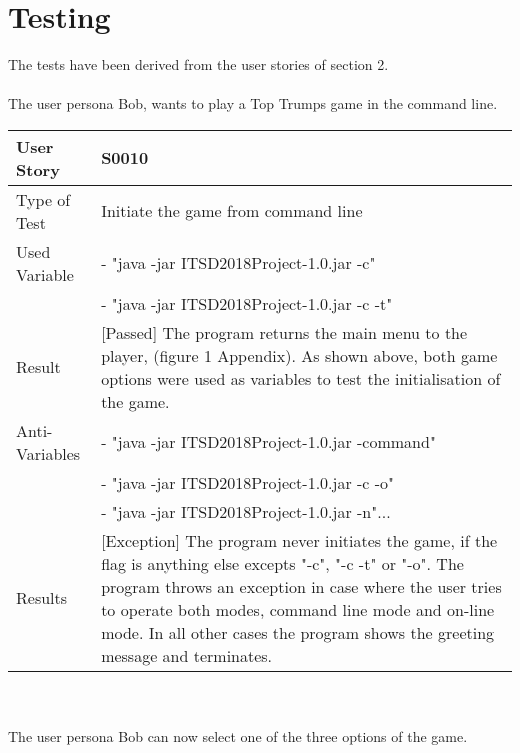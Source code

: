 
\newpage

\section{Testing}

The tests have been derived from the user stories of section 2.\\
\vspace{0.1cm}\\
The user persona Bob, wants to play a Top Trumps game in the command line.    
\vspace{0.4cm}\\
\begin{tabular}{l | p{10cm}}
User Story & \textbf{S0010} \\
\hline
Type of Test & Initiate the game from command line\\
\hline
Used Variable & 
 - "java -jar ITSD2018Project-1.0.jar -c" \\
 & 
 - "java -jar ITSD2018Project-1.0.jar -c -t"
\\
\hline
Result & [Passed] The program returns the main menu to the player, (figure 1 Appendix). As shown above, both game options were used as variables to test the initialisation of the game.\\ 
\hline
Anti-Variables & - "java -jar ITSD2018Project-1.0.jar -command"\\
& - "java -jar ITSD2018Project-1.0.jar -c -o"\\
& - "java -jar ITSD2018Project-1.0.jar -n"...\\
\hline
Results & [Exception] The program never initiates the game, if the flag is anything else excepts "-c", "-c -t" or "-o". The program throws an exception in case where the user tries to operate both modes, command line mode and on-line mode. In all other cases the program shows the greeting message and terminates.\\
\hline 
\end{tabular}\\
\vspace{0.8cm}\\ 
The user persona Bob can now select one of the three options of the game.\\
\vspace{0.2cm}\\
